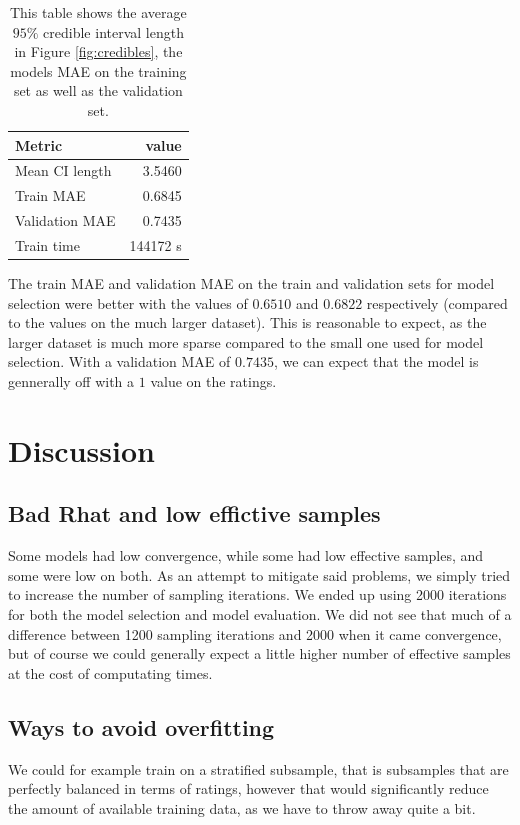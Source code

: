 \documentclass[12pt]{article}
\begin{document}
\begin{table}[H]
    \centering
    \caption{This table shows the average $95\%$ credible interval length in Figure \ref{fig:credibles}, the models MAE on the training set as well as the validation set.}
    \begin{tabular}{l|r}
        \toprule
        Metric & value \\
        \midrule
        Mean CI length & 3.5460 \\
        Train MAE & 0.6845 \\
        Validation MAE & 0.7435 \\
        Train time & 144172 s\\
        \bottomrule
    \end{tabular}
\end{table}
The train MAE and validation MAE on the train and validation sets for model selection were better with the values of $0.6510$ and $0.6822$ respectively (compared to the values on the much larger dataset). This is reasonable to expect, as the larger dataset is much more sparse compared to the small one used for model selection. With a validation MAE of $0.7435$, we can expect that the model is gennerally off with a $1$ value on the ratings. 

\section{Discussion}
    \subsection*{Bad Rhat and low effictive samples}
    Some models had low convergence, while some had low effective samples, and some were low on both. As an attempt to mitigate said problems, we simply tried to increase the number of sampling iterations. We ended up using 2000 iterations for both the model selection and model evaluation. We did not see that much of a difference between 1200 sampling iterations and 2000 when it came convergence, but of course we could generally expect a little higher number of effective samples at the cost of computating times.

    \subsection*{Ways to avoid overfitting}
    We could for example train on a stratified subsample, that is subsamples that are perfectly balanced in terms of ratings, however that would significantly reduce the amount of available training data, as we have to throw away quite a bit.
\end{document}
